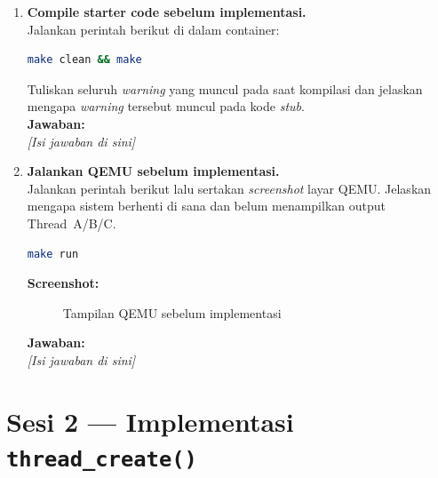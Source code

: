 \begin{enumerate}

    \item \textbf{Compile starter code sebelum implementasi.}\\
    Jalankan perintah berikut di dalam container:

    \begin{lstlisting}[language=bash, caption={Perintah kompilasi awal}]
make clean && make
    \end{lstlisting}

    Tuliskan seluruh \textit{warning} yang muncul pada saat kompilasi dan
    jelaskan mengapa \textit{warning} tersebut muncul pada kode
    \textit{stub}.\\[0.3cm]
    \textbf{Jawaban:}\\
    \textit{[Isi jawaban di sini]}

    \item \textbf{Jalankan QEMU sebelum implementasi.}\\
    Jalankan perintah berikut lalu sertakan \textit{screenshot} layar QEMU.
    Jelaskan mengapa sistem berhenti di sana dan belum menampilkan
    output Thread~A/B/C.

    \begin{lstlisting}[language=bash, caption={Menjalankan emulator QEMU}]
make run
    \end{lstlisting}

    \textbf{Screenshot:}
    \begin{figure}[H]
        \centering
        \caption{Tampilan QEMU sebelum implementasi}
    \end{figure}

    \textbf{Jawaban:}\\
    \textit{[Isi jawaban di sini]}

\end{enumerate}

\section{Sesi 2 --- Implementasi \texttt{thread\_create()}}

